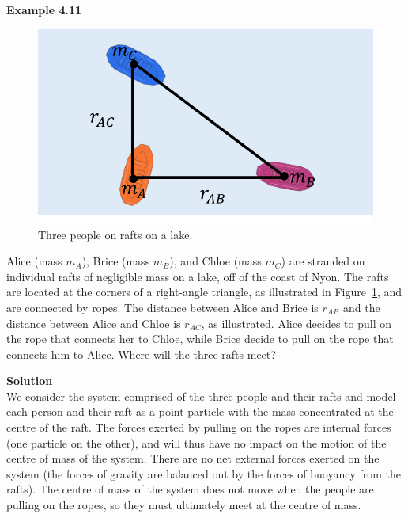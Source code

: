 \documentclass[9pt,arxiv,red]{lapreprint}
\begin{document}
\begin{framed}
\textbf{Example 4.11}\\
\begin{figure}[!htbp]
\centering
\includegraphics[width=0.7\linewidth]{files/cmraft-2ce0a582e824c4cb4f6807c04093e5f7.png}
\caption[]{Three people on rafts on a lake.}
\label{fig:momentumandcm:cmraft}
\end{figure}

Alice (mass $m_A$), Brice (mass $m_B$), and Chloe (mass $m_C$) are stranded on individual rafts of negligible mass on a lake, off of the coast of Nyon. The rafts are located at the corners of a right-angle triangle, as illustrated in Figure~\ref{fig:momentumandcm:cmraft}, and are connected by ropes. The distance between Alice and Brice is $r_{AB}$ and the distance between Alice and Chloe is $r_{AC}$, as illustrated. Alice decides to pull on the rope that connects her to Chloe, while Brice decide to pull on the rope that connects him to Alice. Where will the three rafts meet?

\begin{framed}
\textbf{Solution}\\
We consider the system comprised of the three people and their rafts and model each person and their raft as a point particle with the mass concentrated at the centre of the raft. The forces exerted by pulling on the ropes are internal forces (one particle on the other), and will thus have no impact on the motion of the centre of mass of the system. There are no net external forces exerted on the system (the forces of gravity are balanced out by the forces of buoyancy from the rafts). The centre of mass of the system does not move when the people are pulling on the ropes, so they must ultimately meet at the centre of mass.


\end{framed}
\end{framed}
\end{document}
